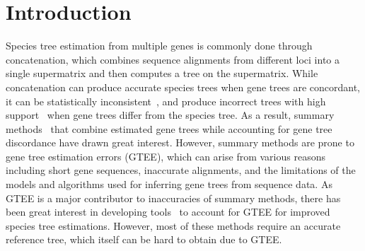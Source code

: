 \documentclass[runningheads]{llncs}
\begin{document}
\section{Introduction}
\vspace{-8pt}
Species tree estimation from multiple genes is commonly done through concatenation, which combines sequence alignments from different loci into a single supermatrix and then computes a tree on the supermatrix. While concatenation can produce accurate species trees when gene trees are concordant, it can be statistically inconsistent~\cite{roch2015likelihood,consensus-inconsistent}, and produce incorrect trees with high support~\cite{kubatko-degnan-2007} when gene trees differ from the species tree. As a result, summary methods~\cite{mpest,astral,larget-bioinf2010,glass,stem,svdquartet,steac,njst,wqfm,astrid,stelar} that combine estimated gene trees while accounting for gene tree discordance have drawn great interest. However, summary methods are prone to gene tree estimation errors (GTEE), which can arise from various reasons including short gene sequences, inaccurate alignments, and the limitations of the models and algorithms used for inferring gene trees from sequence data. 
As GTEE is a major contributor to inaccuracies of summary methods, there has been great interest in developing tools~\cite{notung,treefix,rasmussen2011bayesian,traction,profilenj,tt,treefix-dtl-bansal2015improved,nguyen2012accounting,jacox2017resolution,lafond2017gene} to account for GTEE for improved species tree estimations. However, most of these methods require an accurate reference tree, which itself can be hard to obtain due to GTEE. %
\end{document}
